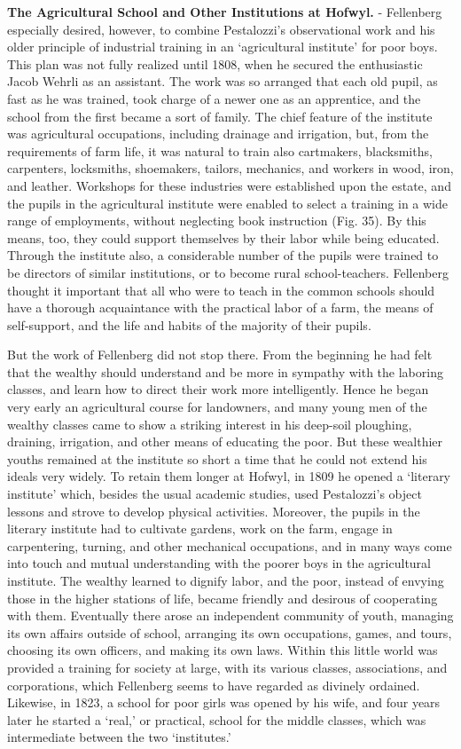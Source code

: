 \documentclass[
]{book}
\begin{document}
\textbf{The Agricultural School and Other Institutions at Hofwyl.} - Fellenberg especially desired, however, to combine Pestalozzi's observational work and his older principle of industrial training in an `agricultural institute' for poor boys. This plan was not fully realized until 1808, when he secured the enthusiastic Jacob Wehrli as an assistant. The work was so arranged that each old pupil, as fast as he was trained, took charge of a newer one as an apprentice, and the school from the first became a sort of family. The chief feature of the institute was agricultural occupations, including drainage and irrigation, but, from the requirements of farm life, it was natural to train also cartmakers, blacksmiths, carpenters, locksmiths, shoemakers, tailors, mechanics, and workers in wood, iron, and leather. Workshops for these industries were established upon the estate, and the pupils in the agricultural institute were enabled to select a training in a wide range of employments, without neglecting book instruction (Fig. 35). By this means, too, they could support themselves by their labor while being educated. Through the institute also, a considerable number of the pupils were trained to be directors of similar institutions, or to become rural school-teachers. Fellenberg thought it important that all who were to teach in the common schools should have a thorough acquaintance with the practical labor of a farm, the means of self-support, and the life and habits of the majority of their pupils.

But the work of Fellenberg did not stop there. From the beginning he had felt that the wealthy should understand and be more in sympathy with the laboring classes, and learn how to direct their work more intelligently. Hence he began very early an agricultural course for landowners, and many young men of the wealthy classes came to show a striking interest in his deep-soil ploughing, draining, irrigation, and other means of educating the poor. But these wealthier youths remained at the institute so short a time that he could not extend his ideals very widely. To retain them longer at Hofwyl, in 1809 he opened a `literary institute' which, besides the usual academic studies, used Pestalozzi's object lessons and strove to develop physical activities. Moreover, the pupils in the literary institute had to cultivate gardens, work on the farm, engage in carpentering, turning, and other mechanical occupations, and in many ways come into touch and mutual understanding with the poorer boys in the agricultural institute. The wealthy learned to dignify labor, and the poor, instead of envying those in the higher stations of life, became friendly and desirous of cooperating with them. Eventually there arose an independent community of youth, managing its own affairs outside of school, arranging its own occupations, games, and tours, choosing its own officers, and making its own laws. Within this little world was provided a training for society at large, with its various classes, associations, and corporations, which Fellenberg seems to have regarded as divinely ordained. Likewise, in 1823, a school for poor girls was opened by his wife, and four years later he started a `real,' or practical, school for the middle classes, which was intermediate between the two `institutes.'
\end{document}
